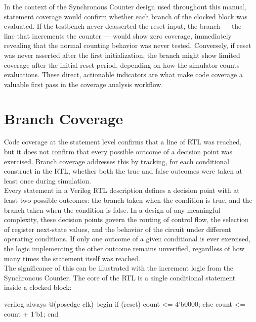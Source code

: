 In the context of the Synchronous Counter design used throughout this manual, statement coverage would confirm whether each branch of the clocked  block was evaluated. If the testbench never deasserted the reset input, the  branch — the line that increments the counter — would show zero coverage, immediately revealing that the normal counting behavior was never tested. Conversely, if reset was never asserted after the first initialization, the  branch might show limited coverage after the initial reset period, depending on how the simulator counts evaluations. These direct, actionable indicators are what make code coverage a valuable first pass in the coverage analysis workflow.\\

\section{Branch Coverage}
\label{sec:branch-coverage}

Code coverage at the statement level confirms that a line of RTL was reached, but it does not confirm that every possible outcome of a decision point was exercised. Branch coverage addresses this by tracking, for each conditional construct in the RTL, whether both the true and false outcomes were taken at least once during simulation.\\

Every  statement in a Verilog RTL description defines a decision point with at least two possible outcomes: the branch taken when the condition is true, and the branch taken when the condition is false. In a design of any meaningful complexity, these decision points govern the routing of control flow, the selection of register next-state values, and the behavior of the circuit under different operating conditions. If only one outcome of a given conditional is ever exercised, the logic implementing the other outcome remains unverified, regardless of how many times the statement itself was reached.\\

The significance of this can be illustrated with the increment logic from the Synchronous Counter. The core of the RTL is a single conditional statement inside a clocked block:

\begin{codeblock}{verilog}
always @(posedge clk) begin
    if (reset)
        count <= 4'b0000;
    else
        count <= count + 1'b1;
end
\end{codeblock}

